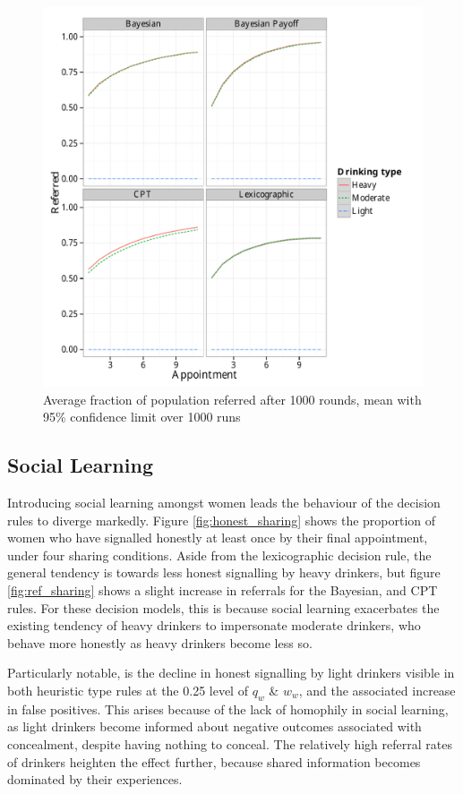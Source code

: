 \begin{figure}[H]
\includegraphics[width=119mm]{figures/ref_plot}
\caption{Average fraction of population referred after 1000 rounds, mean with 95\% confidence limit over 1000 runs\label{fig:referrals}}
\end{figure}

\subsection{Social Learning}
\label{sub:sharing_results}

Introducing social learning amongst women leads the behaviour of the decision rules to diverge markedly. Figure \ref{fig:honest_sharing} shows the proportion of women who have signalled honestly at least once by their final appointment, under four sharing conditions. Aside from the lexicographic decision rule, the general tendency is towards less honest signalling by heavy drinkers, but figure \ref{fig:ref_sharing} shows a slight increase in referrals for the Bayesian, and \ac{CPT} rules. For these decision models, this is because social learning exacerbates the existing tendency of heavy drinkers to impersonate moderate drinkers, who behave more honestly as heavy drinkers become less so.

Particularly notable, is the decline in honest signalling by light drinkers visible in both heuristic type rules at the 0.25 level of \(q_{w}\) \& \(w_{w}\), and the associated increase in false positives. This arises because of the lack of homophily in social learning, as light drinkers become informed about negative outcomes associated with concealment, despite having nothing to conceal. The relatively high referral rates of drinkers heighten the effect further, because shared information becomes dominated by their experiences. 

